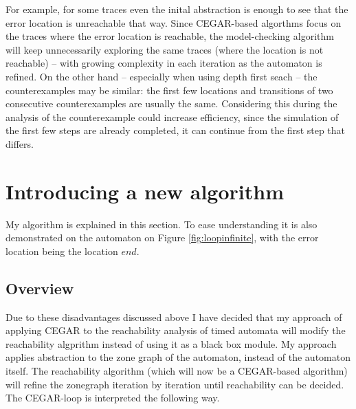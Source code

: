  For example, for some traces even the inital abstraction is enough to see that the error location is unreachable that way. Since CEGAR-based algorthms focus on the traces where the error location is reachable, the model-checking algorithm will keep unnecessarily exploring the same traces (where the location is not reachable) -- with growing complexity in each iteration as the automaton is refined. On the other hand -- especially when using depth first seach -- the counterexamples may be similar: the first few locations and transitions of two consecutive counterexamples are usually the same. Considering this during the analysis of the counterexample could increase efficiency, since the simulation of the first few steps are already completed, it can continue from the first step that differs.
 

  
\section{Introducing a new algorithm}


My algorithm is explained in this section. To ease understanding it is also demonstrated on the automaton on Figure \ref{fig:loopinfinite}, with the error location being the location $end$.

\subsection{Overview}

 Due to these disadvantages discussed above I have decided that my approach of applying CEGAR to the reachability analysis of timed automata will modify the reachability algprithm instead of using it as a black box module. My approach applies abstraction to the zone graph of the automaton, instead of the automaton itself. The reachability algorithm (which will now be a CEGAR-based algorithm) will refine the zonegraph iteration by iteration until reachability can be decided. The CEGAR-loop is interpreted the following way.

